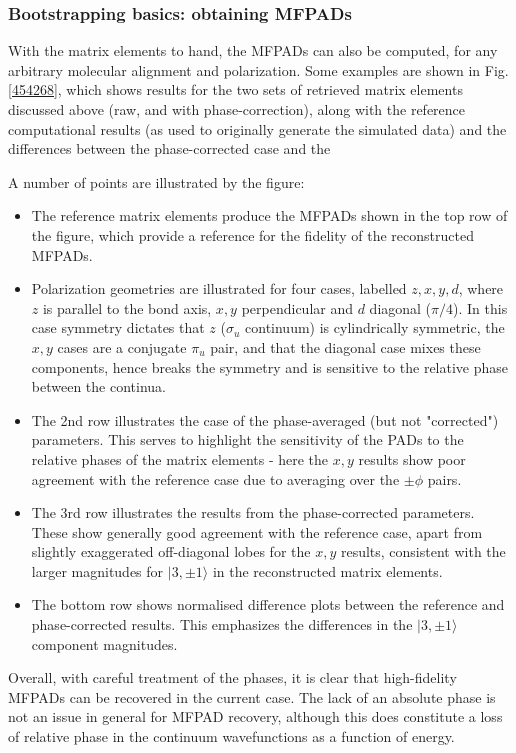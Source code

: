 \subsubsection{Bootstrapping basics: obtaining MFPADs}

With the matrix elements to hand, the MFPADs can also be computed, for any arbitrary molecular alignment and polarization. Some examples are shown in Fig. \ref{454268}, which shows results for the two sets of retrieved matrix elements discussed above (raw, and with phase-correction), along with the reference computational results (as used to originally generate the simulated data) and the differences between the phase-corrected case and the 

A number of points are illustrated by the figure:

\begin{itemize}
\item The reference matrix elements produce the MFPADs shown in the top row of the figure, which provide a reference for the fidelity of the reconstructed MFPADs. 
\item Polarization geometries are illustrated for four cases, labelled $z,x,y,d$, where $z$ is parallel to the bond axis, $x,y$ perpendicular and $d$ diagonal ($\pi/4$). In this case symmetry dictates that $z$ ($\sigma_u$ continuum) is cylindrically symmetric, the $x,y$ cases are a conjugate $\pi_u$ pair, and that the diagonal case mixes these components, hence breaks the symmetry and is sensitive to the relative phase between the continua.
\item The 2nd row illustrates the case of the phase-averaged (but not "corrected") parameters. This serves to highlight the sensitivity of the PADs to the relative phases of the matrix elements - here the $x,y$ results show poor agreement with the reference case due to averaging over the $\pm\phi$ pairs.
\item The 3rd row illustrates the results from the phase-corrected parameters. These show generally good agreement with the reference case, apart from slightly exaggerated off-diagonal lobes for the $x,y$ results, consistent with the larger magnitudes for $|3,\pm1\rangle$ in the reconstructed matrix elements.
\item The bottom row shows normalised difference plots between the reference and phase-corrected results. This emphasizes the differences in the $|3,\pm1\rangle$ component magnitudes.
\end{itemize}

Overall, with careful treatment of the phases, it is clear that high-fidelity MFPADs can be recovered in the current case. The lack of an absolute phase is not an issue in general for MFPAD recovery, although this does constitute a loss of relative phase in the continuum wavefunctions as a function of energy. %


